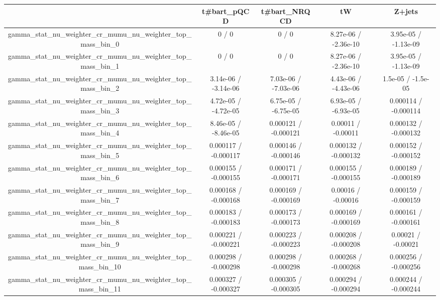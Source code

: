 \documentclass[10pt]{article}
\begin{document}
\begin{table}[htbp]
\begin{center}
\begin{tabular}{|c|c|c|c|c|}
\hline 
      & t#bar{t}_{pQCD}      & t#bar{t}_{NRQCD}      & tW      & Z+jets \\ 
\hline 
  gamma_stat_nu_weighter_cr_mumu_nu_weighter_top_mass_bin_0 & 0 / 0 & 0 / 0 & 8.27e-06 / -2.36e-10 & 3.95e-05 / -1.13e-09 \\ 
  gamma_stat_nu_weighter_cr_mumu_nu_weighter_top_mass_bin_1 & 0 / 0 & 0 / 0 & 8.27e-06 / -2.36e-10 & 3.95e-05 / -1.13e-09 \\ 
  gamma_stat_nu_weighter_cr_mumu_nu_weighter_top_mass_bin_2 & 3.14e-06 / -3.14e-06 & 7.03e-06 / -7.03e-06 & 4.43e-06 / -4.43e-06 & 1.5e-05 / -1.5e-05 \\ 
  gamma_stat_nu_weighter_cr_mumu_nu_weighter_top_mass_bin_3 & 4.72e-05 / -4.72e-05 & 6.75e-05 / -6.75e-05 & 6.93e-05 / -6.93e-05 & 0.000114 / -0.000114 \\ 
  gamma_stat_nu_weighter_cr_mumu_nu_weighter_top_mass_bin_4 & 8.46e-05 / -8.46e-05 & 0.000121 / -0.000121 & 0.00011 / -0.00011 & 0.000132 / -0.000132 \\ 
  gamma_stat_nu_weighter_cr_mumu_nu_weighter_top_mass_bin_5 & 0.000117 / -0.000117 & 0.000146 / -0.000146 & 0.000132 / -0.000132 & 0.000152 / -0.000152 \\ 
  gamma_stat_nu_weighter_cr_mumu_nu_weighter_top_mass_bin_6 & 0.000155 / -0.000155 & 0.000171 / -0.000171 & 0.000155 / -0.000155 & 0.000189 / -0.000189 \\ 
  gamma_stat_nu_weighter_cr_mumu_nu_weighter_top_mass_bin_7 & 0.000168 / -0.000168 & 0.000169 / -0.000169 & 0.00016 / -0.00016 & 0.000159 / -0.000159 \\ 
  gamma_stat_nu_weighter_cr_mumu_nu_weighter_top_mass_bin_8 & 0.000183 / -0.000183 & 0.000173 / -0.000173 & 0.000169 / -0.000169 & 0.000161 / -0.000161 \\ 
  gamma_stat_nu_weighter_cr_mumu_nu_weighter_top_mass_bin_9 & 0.000221 / -0.000221 & 0.000223 / -0.000223 & 0.000208 / -0.000208 & 0.00021 / -0.00021 \\ 
  gamma_stat_nu_weighter_cr_mumu_nu_weighter_top_mass_bin_10 & 0.000298 / -0.000298 & 0.000298 / -0.000298 & 0.000268 / -0.000268 & 0.000256 / -0.000256 \\ 
  gamma_stat_nu_weighter_cr_mumu_nu_weighter_top_mass_bin_11 & 0.000327 / -0.000327 & 0.000305 / -0.000305 & 0.000294 / -0.000294 & 0.000244 / -0.000244 \\ 

\end{tabular}
\end{center}
\end{table}
\end{document}
